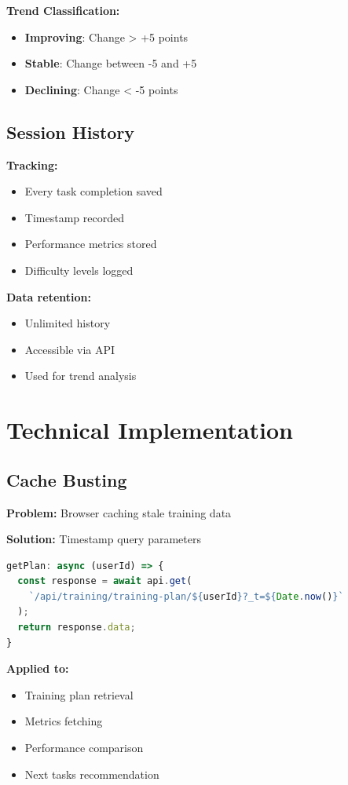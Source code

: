 \documentclass[12pt,a4paper]{article}
\begin{document}
\textbf{Trend Classification:}
\begin{itemize}
    \item \textbf{Improving}: Change > +5 points
    \item \textbf{Stable}: Change between -5 and +5
    \item \textbf{Declining}: Change < -5 points
\end{itemize}

\subsection{Session History}

\textbf{Tracking:}
\begin{itemize}
    \item Every task completion saved
    \item Timestamp recorded
    \item Performance metrics stored
    \item Difficulty levels logged
\end{itemize}

\textbf{Data retention:}
\begin{itemize}
    \item Unlimited history
    \item Accessible via API
    \item Used for trend analysis
\end{itemize}

\section{Technical Implementation}

\subsection{Cache Busting}

\textbf{Problem:} Browser caching stale training data

\textbf{Solution:} Timestamp query parameters
\begin{lstlisting}[language=JavaScript]
getPlan: async (userId) => {
  const response = await api.get(
    `/api/training/training-plan/${userId}?_t=${Date.now()}`
  );
  return response.data;
}
\end{lstlisting}

\textbf{Applied to:}
\begin{itemize}
    \item Training plan retrieval
    \item Metrics fetching
    \item Performance comparison
    \item Next tasks recommendation
\end{itemize}
\end{document}
